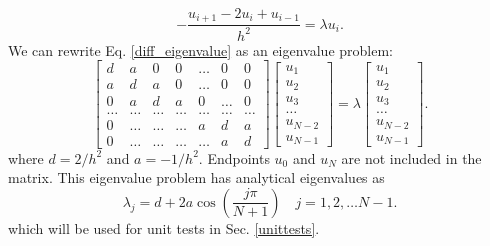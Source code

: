 \documentclass{article}
\begin{document}
\begin{equation}\label{diff_eigenvalue}
-\frac{u_{i+1} -2u_i +u_{i-1} }{h^2}  = \lambda u_i.
\end{equation}
We can rewrite Eq. \ref{diff_eigenvalue} as an eigenvalue problem: 
\begin{equation}
\begin{bmatrix} d& a & 0   & 0    & \dots  &0     & 0 \\
a & d & a & 0    & \dots  &0     &0 \\
0   & a & d & a  &0       &\dots & 0\\
\dots  & \dots & \dots & \dots  &\dots      &\dots & \dots\\
0   & \dots & \dots & \dots  &a  &d & a\\
0   & \dots & \dots & \dots  &\dots       &a & d\end{bmatrix} 
\begin{bmatrix} u_1 \\ u_2 \\ u_3 \\ \dots \\ u_{N-2} \\ u_{N-1}\end{bmatrix} = \lambda \begin{bmatrix} u_1 \\ u_2 \\ u_3 \\ \dots \\ u_{N-2} \\ u_{N-1}\end{bmatrix} . 
\label{eq:matrixse} 
\end{equation}
where $d=2/h^2$ and $a=-1/h^2$. 
Endpoints $u_0$ and $u_N$ are not included in the matrix. 
This eigenvalue problem has analytical eigenvalues as
\begin{equation}
\label{analytical}
\lambda_j = d+2a\cos{\left(\frac{j\pi}{N+1}\right)} \quad j=1,2,\dots N-1.
\end{equation}
which will be used for unit tests in Sec. \ref{unittests}. 
\end{document}
